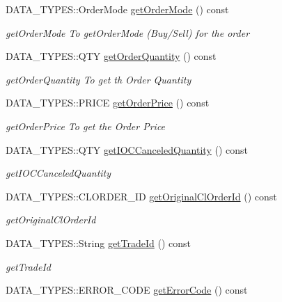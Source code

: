 \begin{DoxyCompactItemize}
D\-A\-T\-A\-\_\-\-T\-Y\-P\-E\-S\-::\-Order\-Mode \hyperlink{class_a_p_i2_1_1_order_confirmation_a92038ac1d484df2fad5cc699e0698c4c}{get\-Order\-Mode} () const 
\begin{DoxyCompactList}\small\item\em get\-Order\-Mode To get\-Order\-Mode (Buy/\-Sell) for the order \end{DoxyCompactList}\item 
D\-A\-T\-A\-\_\-\-T\-Y\-P\-E\-S\-::\-Q\-T\-Y \hyperlink{class_a_p_i2_1_1_order_confirmation_acc2bb9c798b238e7fc6b7323eaa47bcf}{get\-Order\-Quantity} () const 
\begin{DoxyCompactList}\small\item\em get\-Order\-Quantity To get th Order Quantity \end{DoxyCompactList}\item 
D\-A\-T\-A\-\_\-\-T\-Y\-P\-E\-S\-::\-P\-R\-I\-C\-E \hyperlink{class_a_p_i2_1_1_order_confirmation_a079670d134b29954bd78921d139c4710}{get\-Order\-Price} () const 
\begin{DoxyCompactList}\small\item\em get\-Order\-Price To get the Order Price \end{DoxyCompactList}\item 
D\-A\-T\-A\-\_\-\-T\-Y\-P\-E\-S\-::\-Q\-T\-Y \hyperlink{class_a_p_i2_1_1_order_confirmation_acb9b362eaf01e028846e68bdfeec3bb4}{get\-I\-O\-C\-Canceled\-Quantity} () const 
\begin{DoxyCompactList}\small\item\em get\-I\-O\-C\-Canceled\-Quantity \end{DoxyCompactList}\item 
D\-A\-T\-A\-\_\-\-T\-Y\-P\-E\-S\-::\-C\-L\-O\-R\-D\-E\-R\-\_\-\-I\-D \hyperlink{class_a_p_i2_1_1_order_confirmation_acdadf079c62a8a29a657f261a8927e08}{get\-Original\-Cl\-Order\-Id} () const 
\begin{DoxyCompactList}\small\item\em get\-Original\-Cl\-Order\-Id \end{DoxyCompactList}\item 
D\-A\-T\-A\-\_\-\-T\-Y\-P\-E\-S\-::\-String \hyperlink{class_a_p_i2_1_1_order_confirmation_a0e7ca21c48f80d2df2f69d71d1e732d6}{get\-Trade\-Id} () const 
\begin{DoxyCompactList}\small\item\em get\-Trade\-Id \end{DoxyCompactList}\item 
D\-A\-T\-A\-\_\-\-T\-Y\-P\-E\-S\-::\-E\-R\-R\-O\-R\-\_\-\-C\-O\-D\-E \hyperlink{class_a_p_i2_1_1_order_confirmation_aa638e6d385ce1ddb9a4c26af6f2254bd}{get\-Error\-Code} () const 

\end{DoxyCompactItemize}
